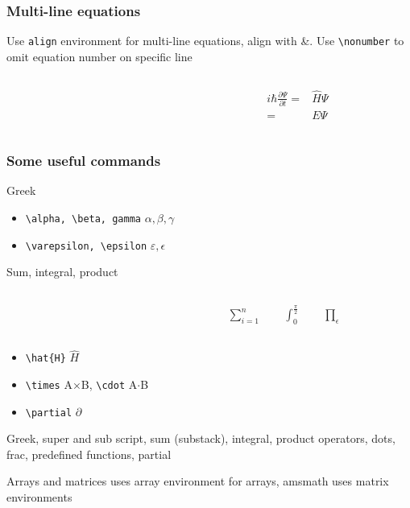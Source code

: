 \documentclass[11pt]{beamer}
\begin{document}
\begin{frame}[fragile]\frametitle{Multi-line equations}
Use \verb+align+ environment for multi-line equations, align with \&. Use \verb+\nonumber+ to omit equation number on specific line
\begin{columns}
	\begin{column}{0.5\textwidth}
	\end{column}
	\begin{column}[T]{0.5\textwidth}
\begin{align}
	i\hbar\frac{\partial \Psi}{\partial t} = & \hat{H} \Psi \nonumber \\
	=& E \Psi
\end{align}
	\end{column}
\end{columns}
\end{frame}
%
%
\begin{frame}[fragile]\frametitle{Some useful commands}
Greek
\begin{itemize}
	\item \verb+\alpha, \beta, gamma+ $\alpha, \beta, \gamma$ \\
	\item \verb+\varepsilon, \epsilon+ $\varepsilon, \epsilon$ \\
\end{itemize}
Sum, integral, product
\begin{columns}
	\begin{column}{0.5\textwidth}
	\end{column}
	\begin{column}[T]{0.5\textwidth}
\begin{align*}
\sum_{i=1}^n \qquad
\int_0^{\frac{\pi}{2}} \qquad
\prod_\epsilon
\end{align*}
	\end{column}
\end{columns}
\begin{itemize}
	\item \verb+\hat{H}+ $\hat{H}$
	\item \verb+\times+ A$\times$B, \verb+\cdot+ A$\cdot$B
	\item \verb+\partial+ $\partial$
\end{itemize}
Greek, super and sub script, sum (substack), integral, product operators, dots, frac, predefined functions, partial
\end{frame}

%
%
\begin{frame}{Arrays and matrices}
uses array environment for arrays, amsmath uses matrix environments
\end{frame}
\end{document}

